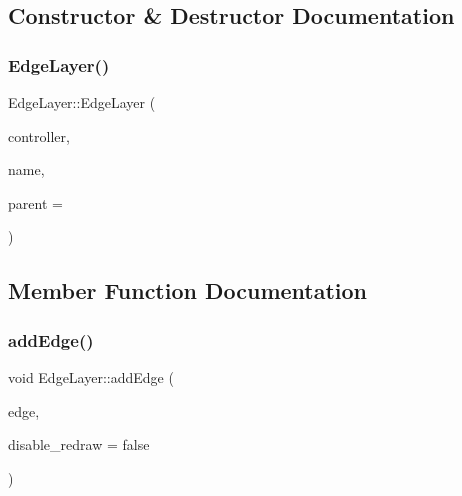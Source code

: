 \subsection{Constructor \& Destructor Documentation}
\mbox{\label{class_edge_layer_acca0dfa633a088706a345989706d393b}} 
\subsubsection{\texorpdfstring{EdgeLayer()}{EdgeLayer()}}
{\footnotesize\ttfamily Edge\+Layer\+::\+Edge\+Layer (\begin{DoxyParamCaption}\item[{\mbox{\hyperlink{class_map_objects_controller}{Map\+Objects\+Controller}} $\ast$}]{controller,  }\item[{const Q\+String \&}]{name,  }\item[{Q\+Object $\ast$}]{parent = {} }\end{DoxyParamCaption})\hspace{0.3cm}{\ttfamily [explicit]}}



\subsection{Member Function Documentation}
\mbox{\label{class_edge_layer_af93684a3bab8c30d7e1217dea684e482}} 
\subsubsection{\texorpdfstring{addEdge()}{addEdge()}}
{\footnotesize\ttfamily void Edge\+Layer\+::add\+Edge (\begin{DoxyParamCaption}\item[{\mbox{\hyperlink{class_edge_map_object}{Edge\+Map\+Object}} $\ast$}]{edge,  }\item[{bool}]{disable\+\_\+redraw = {\ttfamily false} }\end{DoxyParamCaption})}

\mbox{\label{class_edge_layer_a197118a7833836e192db17cfb34930a5}} 
